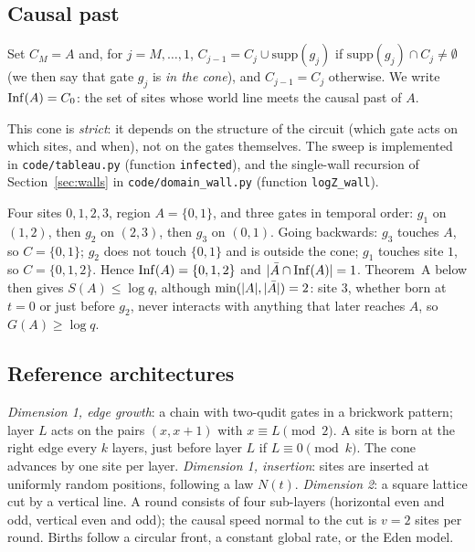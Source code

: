 \subsection{Causal past}

\begin{definition}
Set $C_M=A$ and, for $j=M,\dots,1$, $C_{j-1}=C_j\cup\mathrm{supp}(g_j)$ if $\mathrm{supp}(g_j)\cap C_j\neq\emptyset$ (we then say that gate $g_j$ is \emph{in the cone}), and $C_{j-1}=C_j$ otherwise. We write $\mathrm{Inf}(A)=C_0$: the set of sites whose world line meets the causal past of $A$.
\end{definition}

This cone is \emph{strict}: it depends on the structure of the circuit (which gate acts on which sites, and when), not on the gates themselves. The sweep is implemented in \texttt{code/tableau.py} (function \texttt{infected}), and the single-wall recursion of Section~\ref{sec:walls} in \texttt{code/domain\_wall.py} (function \texttt{logZ\_wall}).

\begin{example}\label{ex:sweep}
Four sites $0,1,2,3$, region $A=\{0,1\}$, and three gates in temporal order: $g_1$ on $(1,2)$, then $g_2$ on $(2,3)$, then $g_3$ on $(0,1)$. Going backwards: $g_3$ touches $A$, so $C=\{0,1\}$; $g_2$ does not touch $\{0,1\}$ and is outside the cone; $g_1$ touches site $1$, so $C=\{0,1,2\}$. Hence $\mathrm{Inf}(A)=\{0,1,2\}$ and $|\bar A\cap\mathrm{Inf}(A)|=1$. Theorem~A below then gives $S(A)\le\log q$, although $\min(|A|,|\bar A|)=2$: site $3$, whether born at $t=0$ or just before $g_2$, never interacts with anything that later reaches $A$, so $G(A)\ge\log q$.
\end{example}

\subsection{Reference architectures}\label{sec:archi}

\emph{Dimension 1, edge growth}: a chain with two-qudit gates in a brickwork pattern; layer $L$ acts on the pairs $(x,x+1)$ with $x\equiv L\pmod2$. A site is born at the right edge every $k$ layers, just before layer $L$ if $L\equiv0\pmod k$. The cone advances by one site per layer. \emph{Dimension 1, insertion}: sites are inserted at uniformly random positions, following a law $N(t)$. \emph{Dimension 2}: a square lattice cut by a vertical line. A round consists of four sub-layers (horizontal even and odd, vertical even and odd); the causal speed normal to the cut is $v=2$ sites per round. Births follow a circular front, a constant global rate, or the Eden model.
